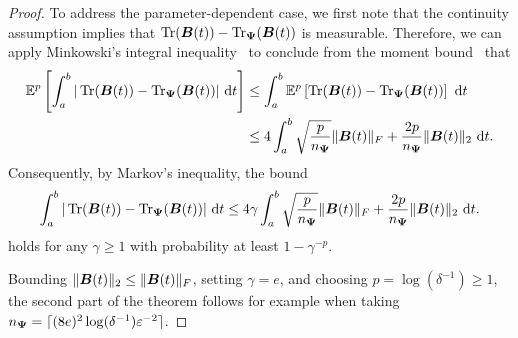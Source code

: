 \begin{proof}

    To address the parameter-dependent case, we first note that the continuity assumption implies that $\operatorname{Tr}(\boldsymbol{B}(t)) - \operatorname{Tr}_{\boldsymbol{\Psi}}(\boldsymbol{B}(t))$ is measurable. Therefore, we can apply Minkowski's integral inequality~\cite[Theorem 202]{hardy-1952-inequalities} to conclude from the moment bound~ that
    \begin{align}
        \mathbb{E}^{p}\left[ \int_{a}^{b} |\operatorname{Tr}(\boldsymbol{B}(t)) - \operatorname{Tr}_{\boldsymbol{\Psi}}(\boldsymbol{B}(t))|~\mathrm{d}t  \right]
        &\leq \int_{a}^{b} \mathbb{E}^{p}\left[ \operatorname{Tr}(\boldsymbol{B}(t)) - \operatorname{Tr}_{\boldsymbol{\Psi}}(\boldsymbol{B}(t)) \right]~\mathrm{d}t \notag \\
        &\leq 4 \int_{a}^{b}  \sqrt{\frac{p}{n_{\boldsymbol{\Psi}}}}  \lVert \boldsymbol{B}(t) \rVert _F + \frac{2 p}{n_{\boldsymbol{\Psi}}} \lVert \boldsymbol{B}(t) \rVert _2 ~\mathrm{d}t.
    \end{align}
    Consequently, by Markov's inequality, the bound 
    \begin{equation} 
        \int_{a}^{b} |\operatorname{Tr}(\boldsymbol{B}(t)) - \operatorname{Tr}_{\boldsymbol{\Psi}}(\boldsymbol{B}(t))|~\mathrm{d}t \leq 4 \gamma \int_{a}^{b} \sqrt{\frac{p}{n_{\boldsymbol{\Psi}}}}  \lVert \boldsymbol{B}(t) \rVert _F + \frac{2 p}{n_{\boldsymbol{\Psi}}} \lVert \boldsymbol{B}(t) \rVert _2 ~\mathrm{d}t.
    \end{equation}
    holds for any $\gamma \geq 1$ with probability at least $1 - \gamma^{-p}$. 

    Bounding $\lVert \boldsymbol{B}(t) \rVert _2 \leq \lVert \boldsymbol{B}(t) \rVert _F$, setting $\gamma = e$, and choosing $p = \log(\delta^{-1}) \geq 1$, the second part of the theorem follows for example when taking $n_{\boldsymbol{\Psi}} = \lceil (8 e)^2 \log(\delta^{-1}) \varepsilon^{-2} \rceil$.
\end{proof}

